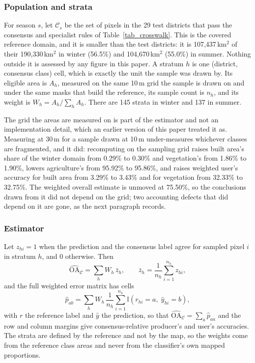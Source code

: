 \documentclass[conference]{IEEEtran}
\begin{document}
\subsubsection{Population and strata}
For season $s$, let $\mathcal{C}_s$ be the set of pixels in the 29 test districts that pass the consensus and specialist rules of Table~\ref{tab_crosswalk}. This is the covered reference domain, and it is smaller than the test districts: it is 107,437\,km$^2$ of their 190,330\,km$^2$ in winter (56.5\%) and 104,670\,km$^2$ (55.0\%) in summer. Nothing outside it is assessed by any figure in this paper. A stratum $h$ is one (district, consensus class) cell, which is exactly the unit the sample was drawn by. Its eligible area is $A_h$, measured on the same 10\,m grid the sample is drawn on and under the same masks that build the reference, its sample count is $n_h$, and its weight is $W_h = A_h/\sum_h A_h$. There are 145 strata in winter and 137 in summer.

The grid the areas are measured on is part of the estimator and not an implementation detail, which an earlier version of this paper treated it as. Measuring at 30\,m for a sample drawn at 10\,m under-measures whichever classes are fragmented, and it did: recomputing on the sampling grid raises built area's share of the winter domain from 0.29\% to 0.30\% and vegetation's from 1.86\% to 1.90\%, lowers agriculture's from 95.92\% to 95.86\%, and raises weighted user's accuracy for built area from 3.29\% to 3.43\% and for vegetation from 32.33\% to 32.75\%. The weighted overall estimate is unmoved at 75.50\%, so the conclusions drawn from it did not depend on the grid; two accounting defects that did depend on it are gone, as the next paragraph records.

\subsubsection{Estimator}
Let $z_{hi}=1$ when the prediction and the consensus label agree for sampled pixel $i$ in stratum $h$, and 0 otherwise. Then
\begin{equation}
\widehat{\mathrm{OA}}_{\mathcal{C}} = \sum_h W_h \, \bar{z}_h,
\qquad
\bar{z}_h = \frac{1}{n_h}\sum_{i=1}^{n_h} z_{hi},
\label{eq:oac}
\end{equation}
and the full weighted error matrix has cells
\begin{equation}
\hat{p}_{ab} = \sum_h W_h \, \frac{1}{n_h} \sum_{i=1}^{n_h} \mathbb{I}\!\left(r_{hi}=a,\; \hat{y}_{hi}=b\right),
\label{eq:pab}
\end{equation}
with $r$ the reference label and $\hat{y}$ the prediction, so that $\widehat{\mathrm{OA}}_{\mathcal{C}} = \sum_a \hat{p}_{aa}$ and the row and column margins give consensus-relative producer's and user's accuracies. The strata are defined by the reference and not by the map, so the weights come from the reference class areas and never from the classifier's own mapped proportions.
\end{document}
